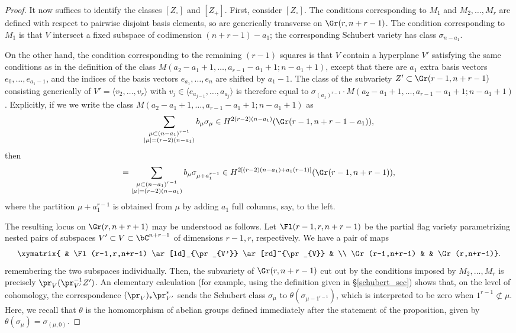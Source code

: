 \begin{proof}
It now suffices to identify the classes $[Z_\circ]$ and $[Z_+]$. First, consider $[Z_\circ]$. The conditions corresponding to $M_1$ and $M_2,\ldots,M_r$ are defined with respect to pairwise disjoint basis elements, so are generically transverse on $\Gr(r,n+r-1)$. The condition corresponding to $M_1$ is that $V$ intersect a fixed subspace of codimension $(n+r-1)-a_1$; the corresponding Schubert variety has class $\sigma_{n-a_1}$.

On the other hand, the condition corresponding to the remaining $(r-1)$ squares is that $V$ contain a hyperplane $V'$ satisfying the same conditions as in the definition of the class $M(a_2-a_1+1,\ldots,a_{r-1}-a_1+1;n-a_1+1)$, except that there are $a_1$ extra basis vectors $e_0,\ldots,e_{a_1-1}$, and the indices of the basis vectors $e_{a_1},\ldots,e_n$ are shifted by $a_1-1$. The class of the subvariety $Z'\subset \Gr(r-1,n+r-1)$ consisting generically of $V'=\langle v_2,\ldots,v_r\rangle$ with $v_j\in \langle e_{a_{j-1}},\ldots,a_{a_{j}}\rangle$ is therefore equal to $\sigma_{(a_1)^{r-1}}\cdot M(a_2-a_1+1,\ldots,a_{r-1}-a_1+1;n-a_1+1)$. Explicitly, if we we write the class $M(a_2-a_1+1,\ldots,a_{r-1}-a_1+1;n-a_1+1)$ as
\begin{equation*}
\sum_{\substack{\mu\subset(n-a_1)^{r-1} \\ |\mu|=(r-2)(n-a_1)}} b_\mu\sigma_\mu\in H^{2(r-2)(n-a_1)}(\Gr(r-1,n+r-1-a_1)),
\end{equation*}
then 
\begin{equation*}
[Z']=\sum_{\substack{\mu\subset(n-a_1)^{r-1} \\ |\mu|=(r-2)(n-a_1)}} b_\mu\sigma_{\mu+a_1^{r-1}}\in H^{2[(r-2)(n-a_1)+a_1(r-1)]}(\Gr(r-1,n+r-1)),
\end{equation*}
where the partition $\mu+a_1^{r-1}$ is obtained from $\mu$ by adding $a_1$ full columns, say, to the left.

The resulting locus on $\Gr(r,n+r+1)$ may be understood as follows. Let $\Fl(r-1,r,n+r-1)$ be the partial flag variety parametrizing nested pairs of subspaces $V'\subset V\subset \bC^{n+r-1}$ of dimensions $r-1,r$, respectively. We have a pair of maps
\begin{equation*}
\xymatrix{ & \Fl(r-1,r,n+r-1) \ar[ld]_{\pr_{V'}} \ar[rd]^{\pr_{V}} & \\
\Gr(r-1,n+r-1) & & \Gr(r,n+r-1)}.
\end{equation*}
remembering the two subspaces individually. Then, the subvariety of $\Gr(r,n+r-1)$ cut out by the conditions imposed by $M_2,\ldots,M_r$ is precisely $\pr_V(\pr_{V'}^{-1}Z')$. An elementary calculation (for example, using the definition given in \S\ref{schubert_sec}) shows that, on the level of cohomology, the correspondence $(\pr_V)_{*}\pr_{V'}^{*}$ sends the Schubert class $\sigma_\mu$ to $\theta(\sigma_{\mu-1^{r-1}})$, which is interpreted to be zero when $1^{r-1}\not\subset\mu$. Here, we recall that $\theta$ is the homomorphism of abelian groups defined immediately after the statement of the proposition, given by $\theta(\sigma_\mu)=\sigma_{(\mu,0)}$.


\end{proof}
